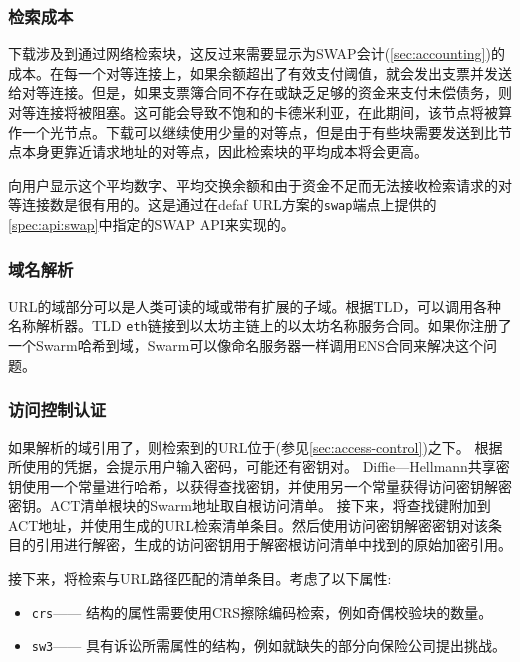 \subsubsection{检索成本}

下载涉及到通过网络检索块，这反过来需要显示为SWAP会计(\ref{sec:accounting})的成本。在每一个对等连接上，如果余额超出了有效支付阈值，就会发出支票并发送给对等连接。但是，如果支票簿合同不存在或缺乏足够的资金来支付未偿债务，则对等连接将被阻塞。这可能会导致不饱和的卡德米利亚，在此期间，该节点将被算作一个光节点。下载可以继续使用少量的对等点，但是由于有些块需要发送到比节点本身更靠近请求地址的对等点，因此检索块的平均成本将会更高。

向用户显示这个平均数字、平均交换余额和由于资金不足而无法接收检索请求的对等连接数是很有用的。这是通过在defaf URL方案的\lstinline{swap}端点上提供的\ref{spec:api:swap}中指定的SWAP API来实现的。


\subsubsection{域名解析}

URL的域部分可以是人类可读的域或带有扩展的子域。根据TLD，可以调用各种名称解析器。TLD \lstinline{eth}链接到以太坊主链上的以太坊名称服务合同。如果你注册了一个Swarm哈希到域，Swarm可以像命名服务器一样调用ENS合同来解决这个问题。 

\subsubsection{访问控制认证}

如果解析的域引用了，则检索到的URL位于(参见\ref{sec:access-control})之下。
根据所使用的凭据，会提示用户输入密码，可能还有密钥对。
Diffie—Hellmann共享密钥使用一个常量进行哈希，以获得查找密钥，并使用另一个常量获得访问密钥解密密钥。ACT清单根块的Swarm地址取自根访问清单。
接下来，将查找键附加到ACT地址，并使用生成的URL检索清单条目。然后使用访问密钥解密密钥对该条目的引用进行解密，生成的访问密钥用于解密根访问清单中找到的原始加密引用。

接下来，将检索与URL路径匹配的清单条目。考虑了以下属性:

\begin{itemize}
    \item \lstinline{crs}——{
    结构的属性需要使用CRS擦除编码检索，例如奇偶校验块的数量}。
    \item \lstinline{sw3}——{ 具有诉讼所需属性的结构，例如就缺失的部分向保险公司提出挑战}。 
\end{itemize}



